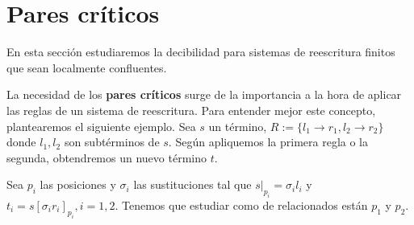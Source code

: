 \section{Pares críticos}

En esta sección estudiaremos la decibilidad para sistemas de
reescritura finitos que sean localmente confluentes.

La necesidad de los \textbf{pares críticos} surge de la importancia a la hora
de aplicar las reglas de un sistema de reescritura. Para entender
mejor este concepto, plantearemos el siguiente ejemplo. Sea $s$ un
término, $R := \{ l_1 \rightarrow r_1, l_2 \rightarrow r_2 \}$ donde
$l_1, l_2$ son subtérminos de $s$. Según apliquemos la primera regla o
la segunda, obtendremos un nuevo término $t$.

\begin{figure}[h]
  \centering
\end{figure}

Sea $p_i$ las posiciones y $\sigma_i$ las sustituciones tal que
$s|_{p_i} = \sigma_i l_i$ y $t_i = s[\sigma_i r_i ]_{p_i}, i
=1,2$. Tenemos que estudiar como de relacionados están $p_1$ y $p_2$.


